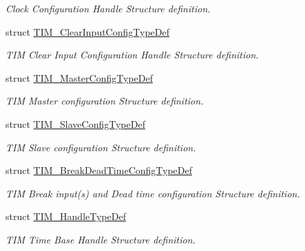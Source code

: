 \begin{DoxyCompactItemize}
\begin{DoxyCompactList}\small\item\em Clock Configuration Handle Structure definition. \end{DoxyCompactList}\item 
struct \hyperlink{struct_t_i_m___clear_input_config_type_def}{T\+I\+M\+\_\+\+Clear\+Input\+Config\+Type\+Def}
\begin{DoxyCompactList}\small\item\em T\+IM Clear Input Configuration Handle Structure definition. \end{DoxyCompactList}\item 
struct \hyperlink{struct_t_i_m___master_config_type_def}{T\+I\+M\+\_\+\+Master\+Config\+Type\+Def}
\begin{DoxyCompactList}\small\item\em T\+IM Master configuration Structure definition. \end{DoxyCompactList}\item 
struct \hyperlink{struct_t_i_m___slave_config_type_def}{T\+I\+M\+\_\+\+Slave\+Config\+Type\+Def}
\begin{DoxyCompactList}\small\item\em T\+IM Slave configuration Structure definition. \end{DoxyCompactList}\item 
struct \hyperlink{struct_t_i_m___break_dead_time_config_type_def}{T\+I\+M\+\_\+\+Break\+Dead\+Time\+Config\+Type\+Def}
\begin{DoxyCompactList}\small\item\em T\+IM Break input(s) and Dead time configuration Structure definition. \end{DoxyCompactList}\item 
struct \hyperlink{struct_t_i_m___handle_type_def}{T\+I\+M\+\_\+\+Handle\+Type\+Def}
\begin{DoxyCompactList}\small\item\em T\+IM Time Base Handle Structure definition. \end{DoxyCompactList}\end{DoxyCompactItemize}
